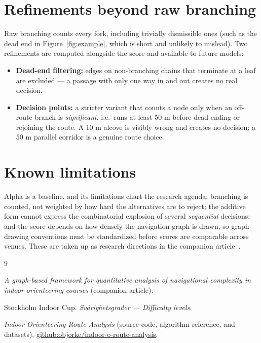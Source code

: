 \documentclass[11pt,a4paper,twocolumn]{article}
\begin{document}
\section{Refinements beyond raw branching}
\label{sec:refinements}

Raw branching counts every fork, including trivially dismissible ones (such
as the dead end in Figure~\ref{fig:example}, which is short and unlikely to
mislead). Two refinements are computed alongside the score and available to
future models:

\begin{itemize}
    \item \textbf{Dead-end filtering:} edges on non-branching chains that
          terminate at a leaf are excluded --- a passage with only one way in
          and out creates no real decision.
    \item \textbf{Decision points:} a stricter variant that counts a node
          only when an off-route branch is \emph{significant}, i.e.\ runs at
          least 50 m before dead-ending or rejoining the route. A 10 m alcove
          is visibly wrong and creates no decision; a 50 m parallel corridor
          is a genuine route choice.
\end{itemize}

\section{Known limitations}
\label{sec:limitations}

Alpha is a baseline, and its limitations chart the research agenda:
branching is counted, not weighted by how hard the alternatives are to
reject; the additive form cannot express the combinatorial explosion of
several \emph{sequential} decisions; and the score depends on how densely
the navigation graph is drawn, so graph-drawing conventions must be
standardized before scores are comparable across venues. These are taken up
as research directions in the companion article~\cite{foundation}.

\begin{thebibliography}{9}

\emph{A graph-based framework for quantitative analysis of navigational
complexity in indoor orienteering courses} (companion article).

Stockholm Indoor Cup. \emph{Sv\r{a}righetsgrader --- Difficulty levels}.

\emph{Indoor Orienteering Route Analysis} (source code, algorithm reference,
and datasets). \newblock
\url{github:objorke/indoor-o-route-analysis}.

\end{thebibliography}
\end{document}

